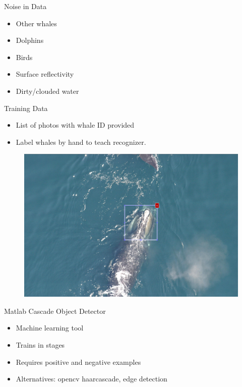 \documentclass{beamer}
\begin{document}
\begin{frame}{Noise in Data}
\begin{itemize}
\item Other whales
\item Dolphins
\item Birds
\item Surface reflectivity
\item Dirty/clouded water
\end{itemize}
\end{frame}

\begin{frame}{Training Data}
\begin{itemize}
\item List of photos with whale ID provided
\item Label whales by hand to teach recognizer.
\end{itemize}
\begin{figure}
\includegraphics[scale=.25]{label.png}
\end{figure}
\end{frame}

\begin{frame}{Matlab Cascade Object Detector}
\begin{itemize}
\item Machine learning tool
\item Trains in stages
\item Requires positive and negative examples
\item Alternatives: opencv haarcascade, edge detection
\end{itemize}
\end{frame}
\end{document}
